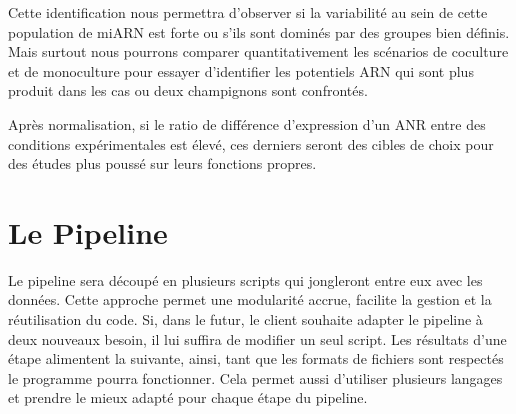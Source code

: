 Cette identification nous permettra d’observer si la variabilité au sein de cette population de miARN est forte ou s’ils sont dominés par des groupes bien définis. Mais surtout nous pourrons comparer quantitativement les scénarios de coculture et de monoculture pour essayer d’identifier les potentiels ARN qui sont plus produit dans les cas ou deux champignons sont confrontés. 

Après normalisation, si le ratio de différence d’expression d'un ANR entre des conditions expérimentales est élevé, ces derniers seront des cibles de choix pour des études plus poussé sur leurs fonctions propres. 

\section{Le Pipeline}
Le pipeline sera découpé en plusieurs scripts qui jongleront entre eux avec les données. Cette approche permet une modularité accrue, facilite la gestion et la réutilisation du code. Si, dans le futur, le client souhaite adapter le pipeline à deux nouveaux besoin, il lui suffira de modifier un seul script. 
Les résultats d'une étape alimentent la suivante, ainsi, tant que les formats de fichiers sont respectés le programme pourra fonctionner. Cela permet aussi d'utiliser plusieurs langages et prendre le mieux adapté pour chaque étape du pipeline.

